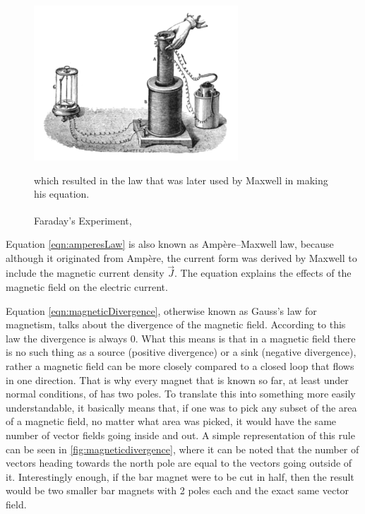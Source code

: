 \begin{figure}
	\centering
	\includegraphics{Figures/faradayexp}
	\decoRule
	\caption[Faraday's Experiment]{Faraday's Experiment,\textsuperscript{\cite{poyser1918magnetism}}} which resulted in the law that was later used by Maxwell in making his equation.
	\label{fig:faradayexp}
\end{figure}

Equation \ref{eqn:amperesLaw} is also known as Ampère–Maxwell law, because although it originated from Ampère, the current form was derived by Maxwell to include the magnetic current density $\vec{J}$. The equation explains the effects of the magnetic field on the electric current.

Equation \ref{eqn:magneticDivergence}, otherwise known as Gauss's law for magnetism, talks about the divergence of the magnetic field. According to this law the divergence is always 0. What this means is that in a magnetic field there is no such thing as a source (positive divergence) or a sink (negative divergence), rather a magnetic field can be more closely compared to a closed loop that flows in one direction. That is why every magnet that is known so far, at least under normal conditions, of has two poles. To translate this into something more easily understandable, it basically means that, if one was to pick any subset of the area of a magnetic field, no matter what area was picked, it would have the same number of vector fields going inside and out. A simple representation of this rule can be seen in \ref{fig:magneticdivergence}, where it can be noted that the number of vectors heading towards the north pole are equal to the vectors going outside of it. Interestingly enough, if the bar magnet were to be cut in half, then the result would be two smaller bar magnets with 2 poles each and the exact same vector field.

